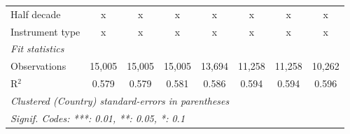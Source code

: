 \begin{tabular}{lccccccc}
   Half decade                                                                      & x            & x             & x              & x              & x             & x             & x\\  
   Instrument type                                                                  & x            & x             & x              & x              & x             & x             & x\\  
   \midrule \emph{Fit statistics}\\
   Observations                                                                     & 15,005       & 15,005        & 15,005         & 13,694         & 11,258        & 11,258        & 10,262\\  
   R$^2$                                                                            & 0.579        & 0.579         & 0.581          & 0.586          & 0.594         & 0.594         & 0.596\\  
   \midrule
   \multicolumn{8}{l}{\emph{Clustered (Country) standard-errors in parentheses}}\\
   \multicolumn{8}{l}{\emph{Signif. Codes: ***: 0.01, **: 0.05, *: 0.1}}\\
\end{tabular}
\par\endgroup


